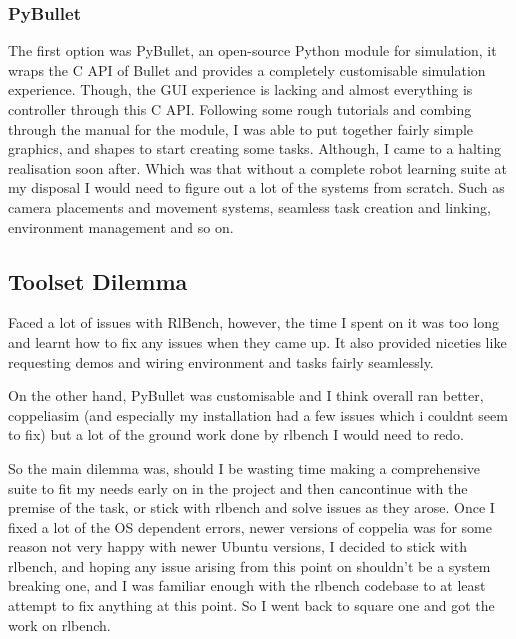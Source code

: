 
\subsubsection{PyBullet}
The first option was PyBullet, an open-source Python module for simulation, it wraps the C API of Bullet and provides a completely customisable simulation experience. Though, the GUI experience is lacking and almost everything is controller through this C API. 
Following some rough tutorials and combing through the manual for the module, I was able to put together fairly simple graphics, and shapes to start creating some tasks. Although, I came to a halting realisation soon after. Which was that without a complete robot learning suite at my disposal I would need to figure out a lot of the systems from scratch. Such as camera placements and movement systems, seamless task creation and linking, environment management and so on.


\subsection{Toolset Dilemma}

Faced a lot of issues with RlBench, however, the time I spent on it was too long and learnt how to fix any issues when they came up. It also provided niceties like requesting demos and wiring environment and tasks fairly seamlessly.

On the other hand, PyBullet was customisable and I think overall ran better, coppeliasim (and especially my installation had a few issues which i couldnt seem to fix) but a lot of the ground work done by rlbench I would need to redo. 

So the main dilemma was, should I be wasting time making a comprehensive suite to fit my needs early on in the project and then cancontinue with the premise of the task, or stick with rlbench and solve issues as they arose. Once I fixed a lot of the OS dependent errors, newer versions of coppelia was for some reason not very happy with newer Ubuntu versions, I decided to stick with rlbench, and hoping any issue arising from this point on shouldn't be a system breaking one, and I was familiar enough with the rlbench codebase to at least attempt to fix anything at this point. So I went back to square one and got the work on rlbench.



